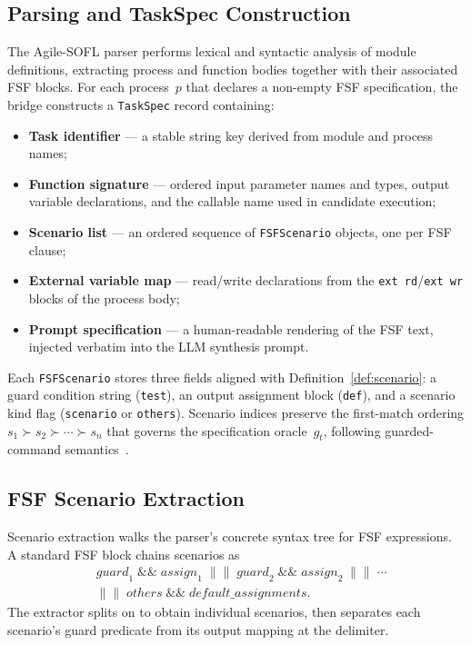 \subsection{Parsing and TaskSpec Construction}

The Agile-SOFL parser performs lexical and syntactic analysis of module
definitions, extracting process and function bodies together with their
associated FSF blocks.  For each process~$p$ that declares a non-empty FSF
specification, the bridge constructs a \texttt{TaskSpec} record containing:
\begin{itemize}
  \item \textbf{Task identifier} --- a stable string key derived from module
        and process names;
  \item \textbf{Function signature} --- ordered input parameter names and
        types, output variable declarations, and the callable name used in
        candidate execution;
  \item \textbf{Scenario list} --- an ordered sequence of
        \texttt{FSFScenario} objects, one per FSF clause;
  \item \textbf{External variable map} --- read/write declarations from the
        \texttt{ext rd}/\texttt{ext wr} blocks of the process body;
  \item \textbf{Prompt specification} --- a human-readable rendering of the
        FSF text, injected verbatim into the LLM synthesis prompt.
\end{itemize}

Each \texttt{FSFScenario} stores three fields aligned with
Definition~\ref{def:scenario}: a guard condition string (\texttt{test}),
an output assignment block (\texttt{def}), and a scenario kind flag
(\texttt{scenario} or \texttt{others}).  Scenario indices preserve the
first-match ordering $s_1 \succ s_2 \succ \cdots \succ s_n$ that governs
the specification oracle~$g_t$, following guarded-command
semantics~\citep{dijkstra1975guarded}.

\subsection{FSF Scenario Extraction}

Scenario extraction walks the parser's concrete syntax tree for FSF
expressions.  A standard FSF block chains scenarios as
\[
  \begin{aligned}
    &\mathit{guard}_1 \;\&\&\; \mathit{assign}_1
    \;\|\|\; \mathit{guard}_2 \;\&\&\; \mathit{assign}_2
    \;\|\|\; \cdots \\
    &\|\|\; \mathit{others} \;\&\&\; \mathit{default\_assignments}.
  \end{aligned}
\]
The extractor splits on \code{||} to obtain individual scenarios, then
separates each scenario's guard predicate from its output mapping at the
\code{\&\&} delimiter.

